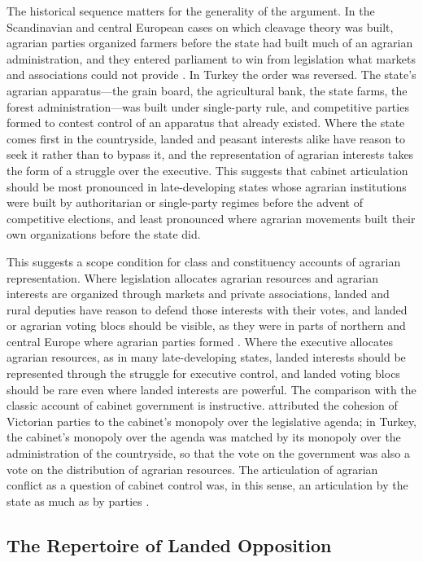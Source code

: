 \documentclass[12pt]{article}
\begin{document}
The historical sequence matters for the generality of the argument. In the Scandinavian and central European cases on which cleavage theory was built, agrarian parties organized farmers before the state had built much of an agrarian administration, and they entered parliament to win from legislation what markets and associations could not provide \citep{lipset1967}. In Turkey the order was reversed. The state's agrarian apparatus---the grain board, the agricultural bank, the state farms, the forest administration---was built under single-party rule, and competitive parties formed to contest control of an apparatus that already existed. Where the state comes first in the countryside, landed and peasant interests alike have reason to seek it rather than to bypass it, and the representation of agrarian interests takes the form of a struggle over the executive. This suggests that cabinet articulation should be most pronounced in late-developing states whose agrarian institutions were built by authoritarian or single-party regimes before the advent of competitive elections, and least pronounced where agrarian movements built their own organizations before the state did.

This suggests a scope condition for class and constituency accounts of agrarian representation. Where legislation allocates agrarian resources and agrarian interests are organized through markets and private associations, landed and rural deputies have reason to defend those interests with their votes, and landed or agrarian voting blocs should be visible, as they were in parts of northern and central Europe where agrarian parties formed \citep{lipset1967}. Where the executive allocates agrarian resources, as in many late-developing states, landed interests should be represented through the struggle for executive control, and landed voting blocs should be rare even where landed interests are powerful. The comparison with the classic account of cabinet government is instructive. \citet{cox1987} attributed the cohesion of Victorian parties to the cabinet's monopoly over the legislative agenda; in Turkey, the cabinet's monopoly over the agenda was matched by its monopoly over the administration of the countryside, so that the vote on the government was also a vote on the distribution of agrarian resources. The articulation of agrarian conflict as a question of cabinet control was, in this sense, an articulation by the state as much as by parties \citep{deleon2009,shefter1994}.

\subsection*{The Repertoire of Landed Opposition}
\end{document}
